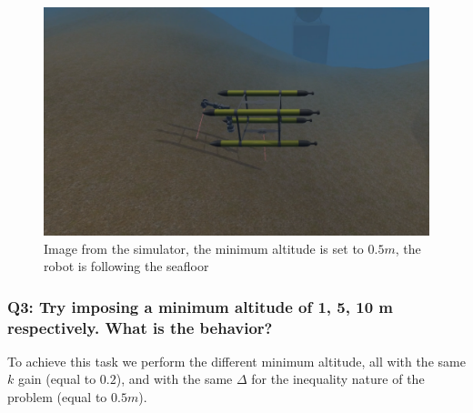 \documentclass{article}
\begin{document}
\begin{figure}[t]
    \centering
    \includegraphics[scale=0.4]{122_MAV1m.png}
    \caption{Image from the simulator, the minimum altitude is set to $0.5m$, the robot is following the seafloor}
    \label{images_2_1}
\end{figure}


\subsubsection{Q3: Try imposing a minimum altitude of 1, 5, 10 m respectively. What is the behavior?}
To achieve this task we perform the different minimum altitude, all with the same $k$ gain (equal to $0.2$), and with the same $\Delta$ for the inequality nature of the problem (equal to $0.5 m$).
\end{document}
